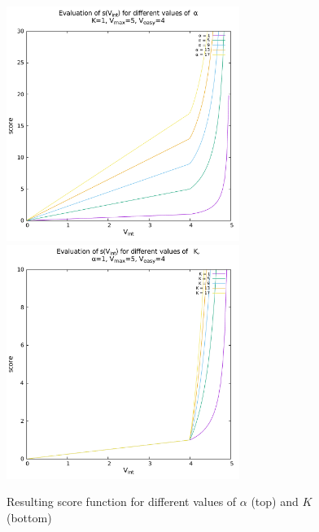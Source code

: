 \begin{figure}[htbp]
  \centering
  \includegraphics[height=3in]{./Graphics/score_alpha}
  \includegraphics[height=3in]{./Graphics/score_k}
  \caption{Resulting score function for different values of $\alpha$ (top) and
  $K$ (bottom) \label{fig:score_function}}
\end{figure}

